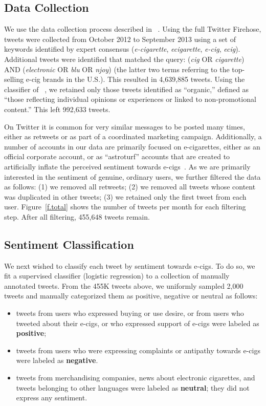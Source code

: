 \documentclass{sig-alternate}
\newcommand{\citenoun}[1]{{\citeauthor{#1}~\cite{#1}}}
\begin{document}
\subsection{Data Collection}
\label{sec:data}
We use the data collection process described in
\citenoun{huang2014cross}. Using the full Twitter Firehose, tweets were
collected from October 2012 to September 2013 using a set of keywords
identified by expert consensus ({\it e-cigarette}, {\it ecigarette}, {\it
  e-cig}, {\it ecig}). Additional tweets were identified that matched the
query: ({\it cig} OR {\it cigarette}) AND ({\it electronic} OR {\it blu} OR
{\it njoy}) (the latter two terms referring to the top-selling e-cig brands in
the U.S.). This resulted in 4,639,885 tweets. Using the classifier of
\citenoun{huang2014cross}, we retained only those tweets identified as
``organic,'' defined as ``those reflecting individual opinions or experiences
or linked to non-promotional content.'' This left 992,633 tweets.

On Twitter it is common for very similar messages to be posted many times,
either as retweets or as part of a coordinated marketing
campaign. Additionally, a number of accounts in our data are primarily focused
on e-cigarettes, either as an official corporate account, or as ``astroturf'' accounts that are created to artificially inflate the perceived
sentiment towards e-cigs~\cite{ratkiewicz2011truthy}.  As we are primarily
interested in the sentiment of genuine, ordinary users, we further filtered
the data as follows: (1) we removed all retweets; (2) we removed all tweets
whose content was duplicated in other tweets; (3) we retained only the first
tweet from each user. Figure~\ref{f.total} shows the number of tweets per
month for each filtering step. After all filtering, 455,648 tweets remain.


\subsection{Sentiment Classification}

We next wished to classify each tweet by sentiment towards e-cigs. To do so, we fit a supervised classifier (logistic regression) to a collection of manually annotated tweets. From the 455K tweets above, we uniformly sampled 2,000 tweets and manually categorized them as positive, negative or neutral as follows: 
\begin{itemize}
\item  tweets from users who expressed buying or use desire, or from users who tweeted about their e-cigs, or who expressed support of e-cigs were labeled as {\bf positive}; 
\item  tweets from users who were expressing complaints or antipathy towards e-cigs were labeled as {\bf negative}. 
\item  tweets from merchandising companies, news about electronic cigarettes, and tweets belonging to other languages were labeled as {\bf neutral}; they did not express any sentiment.
\end{itemize}
\end{document}
